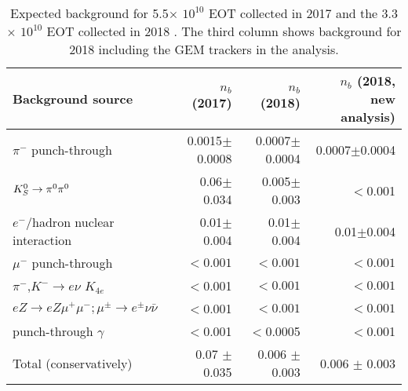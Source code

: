 \begin{table}[bth!]
  \centering
  \caption[Visible mode background]{Expected background for 5.5$\times$ $10^{10}$ EOT collected in 2017 \cite{Banerjee:2018vgk} and the 3.3$\times$ $10^{10}$ EOT collected in 2018 \cite{Banerjee:2019hmi}. The third column shows background for 2018 including the GEM trackers in the analysis.}
  \begin{tabular}{lrrr}
    \hline \hline
    Background source                           & $n_b$ (2017)      &  $n_b$ (2018)   & $n_b$ (2018, new analysis)\\
    \hline
    $\pi^-$ punch-through                        & 0.0015$\pm$0.0008 &  0.0007$\pm$0.0004   & 0.0007$\pm$0.0004   \\    
    $K^0_S \rightarrow \pi^0 \pi^0$                     & 0.06$\pm$0.034    & 0.005$\pm$0.003 &     $<$0.001\\
    $e^-$/hadron nuclear interaction  & 0.01$\pm$0.004    & 0.01$\pm$0.004  & 0.01$\pm$0.004\\    
    $\mu^-$ punch-through                        & $<0.001$ & $<0.001$ & $<0.001$       \\            
    $\pi^-$,$K^- \rightarrow e\nu$ $K_{4e}$              & $<$0.001 & $<0.001$ & $<0.001$\\
    $eZ \rightarrow e Z \mu^+\mu^-;\mu^{\pm}\rightarrow e^{\pm}\nu\bar{\nu}$ & $<$0.001 & $<0.001$ & $<0.001$\\
    punch-through $\gamma$ & $<$0.001 & $<$0.0005 & $<$0.001 \\
    \hline
    Total (conservatively)                      & 0.07 $\pm$ 0.035   & 0.006 $\pm$ 0.003  & 0.006 $\pm$ 0.003\\
    \hline \hline                       
  \end{tabular}
  \label{tab:vis-bkg}
\end{table}

